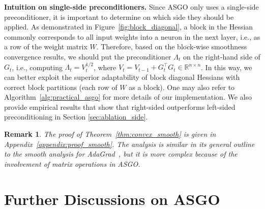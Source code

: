 \documentclass{article}
\newtheorem{remark}{Remark}
\theoremstyle{remark}
\newcommand{\RR}{\mathbb{R}}
\begin{document}
    \textbf{Intuition on single-side preconditioners.} Since ASGO only uses a single-side preconditioner, it is important to determine on which side they should be applied. As demonstrated in Figure~\ref{fig:block_diagonal}, a block in the Hessian commonly corresponds to all input weights into a neuron in the next layer, i.e., as a row of the weight matrix $W$.     
    Therefore, based on the block-wise smoothness convergence results, we should put the preconditioner $\Lambda_t$ on the right-hand side of $G_t$, i.e., 
    computing 
    $\Lambda_t = V_t^{1/2}$, where $V_t = V_{t-1} + G_t^\top G_t \in \RR^{n\times n}$. In this way, we can better exploit the superior adaptability of block diagonal Hessians with correct block partitions (each row of $W$ as a block). One may also refer to Algorithm~\ref{alg:practical_asgo} for more details of our
    implementation. We also provide empirical results that show that right-sided 
    outperforms left-sided preconditioning in Section  \ref{sec:ablation_side}.


    

\begin{remark}
    The proof of Theorem~\ref{thm:convex_smooth} is given in Appendix~\ref{appendix:proof_smooth}. The analysis is similar in its general outline to the smooth analysis for AdaGrad~\citep{levy2018online,liu2024adagrad}, but it is more complex because of the involvement of matrix operations in ASGO.
\end{remark}

\section{Further Discussions on ASGO}\label{sec:discussions}
\end{document}
